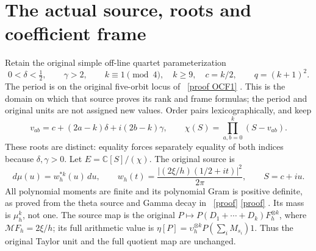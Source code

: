 \documentclass[11pt]{article}
\newcommand{\C}{\mathbb C}
\begin{document}
\section{The actual source, roots and coefficient frame}
Retain the original simple off-line quartet parameterization
\[
 0<\delta<\tfrac12,\qquad \gamma>2,\qquad
 k\equiv1\pmod4,\quad k\ge9,\quad c=k/2,
 \qquad q=(k+1)^2.
 \tag{MR1}
\]
The period is on the original five-orbit locus of \cite{OCF}%
~\href{https://github.com/KokunoYumeto/zeta-function-research-reader/blob/5992ad50c0f2a06921f1fcaded7b4e38097c0739/workbenches/splitzero-tandem/continuations/20260920-original-kernel-mixed-determinants/providers/ORIGINAL_CONDUCTOR_STRIP_FRAME.tex\#L27}{[proof OCF1]}%
{}.
This is the domain on which that source proves its rank and frame
formulas; the period and original units are not assigned new values.
Order pairs lexicographically, and keep
\[
 v_{ab}=c+(2a-k)\delta+i(2b-k)\gamma,
 \qquad \chi(S)=\prod_{a,b=0}^k(S-v_{ab}).\tag{MR2}
\]
These roots are distinct: equality forces separately equality of both
indices because $\delta,\gamma>0$. Let $E=\C[S]/(\chi)$.
The original source is
\[
 d\mu(u)=w_h^{*k}(u)\,du,\qquad
 w_h(t)=\frac{|(2\xi/h)(1/2+it)|^2}{2\pi},\qquad S=c+iu.
 \tag{MR3}
\]
All polynomial moments are finite and its polynomial Gram is positive
definite, as proved from the theta source and Gamma decay in
\cite{Toda,Mixed}%
~\href{https://github.com/KokunoYumeto/zeta-function-research-reader/blob/5992ad50c0f2a06921f1fcaded7b4e38097c0739/workbenches/splitzero-tandem/continuations/20260920-original-kernel-mixed-determinants/providers/TODA_VOLUME_CONTROL.tex\#L1}{[proof]} \href{https://github.com/KokunoYumeto/zeta-function-research-reader/blob/5992ad50c0f2a06921f1fcaded7b4e38097c0739/workbenches/splitzero-tandem/continuations/20260920-original-kernel-mixed-determinants/MIXED_CONFLUENT_PROOF.tex\#L1}{[proof]}%
{}. Its mass is $\mu_h^k$, not one.
The source map is the original
$P\mapsto P(D_1+\cdots+D_k)F_h^{\otimes k}$, where
$\mathcal MF_h=2\xi/h$; its full arithmetic value is
$\eta[P]=\upsilon_h^{\otimes k}P(\sum_iM_{s_i})1$.
Thus the original Taylor unit and the full quotient map are unchanged.
\end{document}

